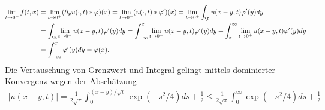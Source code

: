\begin{solution}
\begin{enumerate}[label = (\roman*)]
  \begin{align*}
    \lim_{t \to 0^+} f(t,x) &= \lim_{t \to 0^+} (\partial_x u(\cdot,t)\ast \varphi)(x)
    = \lim_{t \to 0^+} (u(\cdot,t)\ast \varphi^{\prime})(x)
    = \lim_{t \to 0^+} \int_{\R}u(x-y,t) \varphi^{\prime}(y) dy \\
    &= \int_{\R}\lim_{t \to 0^+} u(x-y,t) \varphi^{\prime}(y) dy
    = \int_{-\infty}^x \lim_{t \to 0^+} u(x-y,t) \varphi^{\prime}(y) dy
    + \int_{x}^{\infty} \lim_{t \to 0^+} u(x-y,t) \varphi^{\prime}(y) dy \\
    &= \int_{-\infty}^x \varphi^{\prime}(y) dy = \varphi(x).
  \end{align*}
  Die Vertauschung von Grenzwert und Integral gelingt mittels dominierter Konvergenz
  wegen der Abschätzung
  \begin{align*}
    |u(x-y,t)| = \frac{1}{2\sqrt{\pi}}\int_0^{(x-y)/\sqrt{t}}\exp(-s^2/4)ds + \frac{1}{2}
    \leq \frac{1}{2\sqrt{\pi}}\int_0^{\infty}\exp(-s^2/4)ds + \frac{1}{2}
  \end{align*} \\
\end{enumerate}

\end{solution}

